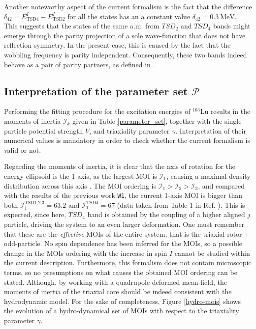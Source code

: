 \documentclass[11pt]{article}
\begin{document}
Another noteworthy aspect of the current formalism is the fact that the difference $\delta_{42}=E_\text{TSD4}^I-E_\text{TSD2}^I$ for all the states has an a constant value $\delta_{42}=0.3\ \text{MeV}$. This suggests that the states of the same a.m. from $TSD_2$ and $TSD_4$ bands might emerge through the parity projection of a sole wave-function that does not have reflection symmetry. In the present case, this is caused by the fact that the wobbling frequency is parity independent. Consequently, these two bands indeed behave as a pair of parity partners, as defined in \cite{chasman1980incipient,raduta2006description,raduta2006simultaneous}.

\subsection{\texorpdfstring{Interpretation of the parameter set $\mathcal{P}$}%
                               {Interpretation of the parameter set P}}

Performing the fitting procedure for the excitation energies of $^{163}$Lu results in the moments of inertia $\mathcal{I}_k$ given in Table \ref{parameter_set}, together with the single-particle potential strength $V$, and triaxiality parameter $\gamma$. Interpretation of their numerical values is mandatory in order to check whether the current formalism is valid or not.

Regarding the moments of inertia, it is clear that the axis of rotation for the energy ellipsoid is the 1-axis, as the largest MOI is $\mathcal{I}_1$, causing a maximal density distribution across this axis \cite{frauendorf2014transverse}. The MOI ordering is $\mathcal{I}_1>\mathcal{I}_2>\mathcal{I}_3$, and compared with the results of the previous work \texttt{W1}, the current 1-axis MOI is bigger than both $\mathcal{I}_1^\text{TSD1,2,3}=63.2$ and $\mathcal{I}_1^\text{TSD4}=67$ (data taken from Table 1 in Ref. \cite{raduta2020towards}). This is expected, since here, $TSD_4$ band is obtained by the coupling of a higher aligned $j$ particle, driving the system to an even larger deformation. One must remember that these are the \emph{effective} MOIs of the entire system, that is the triaxial-rotor + odd-particle. No spin dependence has been inferred for the MOIs, so a possible change in the MOIs ordering with the increase in spin $I$ cannot be studied within the current description. Furthermore, this formalism does not contain microscopic terms, so no presumptions on what causes the obtained MOI ordering can be stated. Although, by working with a quadrupole deformed mean-field, the moments of inertia of the triaxial core should be indeed consistent with the hydrodynamic model. For the sake of completeness, Figure \ref{hydro-mois} shows the evolution of a hydro-dynamical set of MOIs with respect to the triaxiality parameter $\gamma$.
\end{document}
